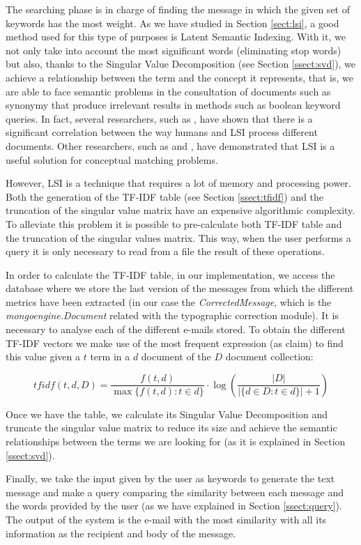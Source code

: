 The searching phase is in charge of finding the message in which the given set of keywords has the most weight. As we have studied in Section \ref{sect:lsi}, a good method used for this type of purposes is Latent Semantic Indexing. With it, we not only take into account the most significant words (eliminating stop words) but also, thanks to the Singular Value Decomposition (see Section \ref{ssect:svd}), we achieve a relationship between the term and the concept it represents, that is, we are able to face semantic problems in the consultation of documents such as synonymy that produce irrelevant results in methods such as boolean keyword queries. In fact, several researchers, such as \cite{landauer1998learning}, have shown that there is a significant correlation between the way humans and LSI process different documents. Other researchers, such as \cite{bartell1992latent} and \cite{ding1999similarity}, have demonstrated that LSI is a useful solution for conceptual matching problems.

However, LSI is a technique that requires a lot of memory and processing power. Both the generation of the TF-IDF table (see Section \ref{ssect:tfidf}) and the truncation of the singular value matrix have an expensive algorithmic complexity. To alleviate this problem it is possible to pre-calculate both TF-IDF table and the truncation of the singular values matrix. This way, when the user performs a query it is only necessary to read from a file the result of these operations.

In order to calculate the TF-IDF table, in our implementation, we access the database where we store the last version of the messages from which the different metrics have been extracted (in our case the \textit{CorrectedMessage}, which is the \textit{mongoengine.Document} related with the typographic correction module). It is necessary to analyse each of the different e-mails stored. To obtain the different TF-IDF vectors we make use of the most frequent expression (as \cite{tang2014email} claim) to find this value given a $t$ term in a $d$ document of the $D$ document collection:

$$
tfidf(t,d,D) = \frac{f(t,d)}{\max\{ f(t,d):t\in d\}}\cdot\log\left(\frac{\lvert D\rvert}{\lvert \{ d\in D: t\in d\}\rvert+1}\right)
$$

Once we have the table, we calculate its Singular Value Decomposition and truncate the singular value matrix to reduce its size and achieve the semantic relationships between the terms we are looking for (as it is explained in Section \ref{ssect:svd}).

Finally, we take the input given by the user as keywords to generate the text message and make a query comparing the similarity between each message and the words provided by the user (as we have explained in Section \ref{ssect:query}). The output of the system is the e-mail with the most similarity with all its information as the recipient and body of the message.
